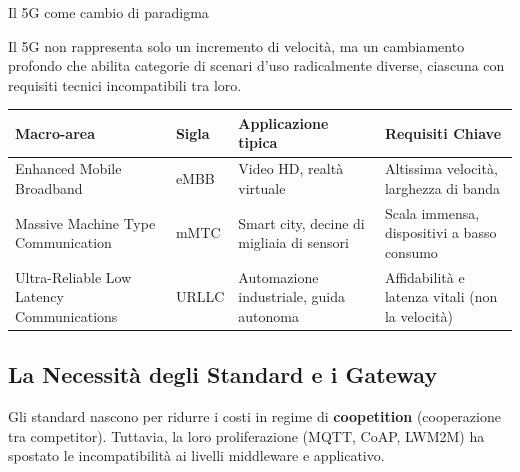 \documentclass[
  italian,
  openany]{book}
\newcounter{none} %
\begin{document}
\begin{callouttip}{Il 5G come cambio di paradigma}

Il 5G non rappresenta solo un incremento di velocità, ma un cambiamento
profondo che abilita categorie di scenari d'uso radicalmente diverse,
ciascuna con requisiti tecnici incompatibili tra loro.

\end{callouttip}

{\def\LTcaptype{none} %
\begin{longtable}[]{@{}
  >{\raggedright\arraybackslash}p{}
  >{\raggedright\arraybackslash}p{}
  >{\raggedright\arraybackslash}p{}
  >{\raggedright\arraybackslash}p{}@{}}
\toprule\noalign{}
\begin{minipage}[b]{\linewidth}\raggedright
Macro-area
\end{minipage} & \begin{minipage}[b]{\linewidth}\raggedright
Sigla
\end{minipage} & \begin{minipage}[b]{\linewidth}\raggedright
Applicazione tipica
\end{minipage} & \begin{minipage}[b]{\linewidth}\raggedright
Requisiti Chiave
\end{minipage} \\
\midrule\noalign{}
\endhead
\bottomrule\noalign{}
\endlastfoot
Enhanced Mobile Broadband & eMBB & Video HD, realtà virtuale & Altissima
velocità, larghezza di banda \\
Massive Machine Type Communication & mMTC & Smart city, decine di
migliaia di sensori & Scala immensa, dispositivi a basso consumo \\
Ultra-Reliable Low Latency Communications & URLLC & Automazione
industriale, guida autonoma & Affidabilità e latenza vitali (non la
velocità) \\
\end{longtable}
}

\subsection{La Necessità degli Standard e i
Gateway}\label{la-necessituxe0-degli-standard-e-i-gateway}

Gli standard nascono per ridurre i costi in regime di
\textbf{coopetition} (cooperazione tra competitor). Tuttavia, la loro
proliferazione (MQTT, CoAP, LWM2M) ha spostato le incompatibilità ai
livelli middleware e applicativo.
\end{document}
